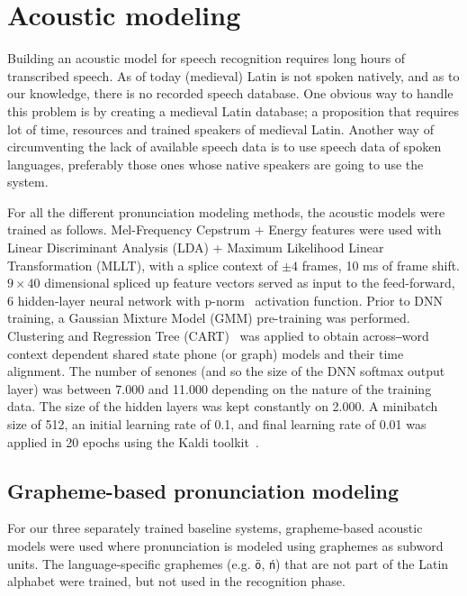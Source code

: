 \documentclass[runningheads,a4paper]{llncs}
\begin{document}
\section{Acoustic modeling}\label{AM}
Building an acoustic model for speech recognition requires long hours of transcribed speech.
As of today (medieval) Latin is not spoken natively, and as to our knowledge, there is no recorded speech database.
One obvious way to handle this problem is by creating a medieval Latin database; a proposition that requires lot of time, resources and trained speakers of medieval Latin. 
Another way of circumventing the lack of available speech data is to use speech data of spoken languages, preferably those ones whose native speakers are going to use the system. 

For all the different pronunciation modeling methods, the acoustic models were trained as follows.
Mel-Frequency Cepstrum $+$ Energy features were used with Linear Discriminant Analysis (LDA) + Maximum Likelihood Linear Transformation (MLLT), with a splice context of $\pm4$ frames, 10 ms of frame shift.
$9\times40$ dimensional spliced up feature vectors served as input to the feed-forward, 6 hidden-layer neural network with p-norm~\cite{kaldi} activation function.
Prior to DNN training, a Gaussian Mixture Model (GMM) pre-training was performed.
Clustering and Regression Tree (CART)~\cite{kaldi} was applied to obtain across‒word context dependent shared state phone (or graph) models and their time alignment.
The number of senones (and so the size of the DNN softmax output layer) was between 7.000 and 11.000 depending on the nature of the training data.
The size of the hidden layers was kept constantly on 2.000.
A minibatch size of 512, an initial learning rate of 0.1, and final learning rate of 0.01 was applied in 20 epochs using the Kaldi toolkit~\cite{kaldi}.

\subsection{Grapheme-based pronunciation modeling}\label{baseline}
For our three separately trained baseline systems, grapheme-based acoustic models were used where pronunciation is modeled using graphemes as subword units.
The language-specific graphemes (e.g. \texttt{\"{o}}, \texttt{\'{n}}) that are not part of the Latin alphabet were trained, but not used in the recognition phase.
\end{document}
